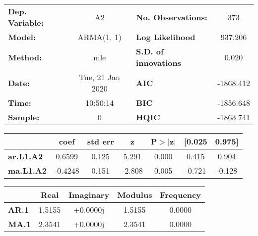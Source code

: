 \begin{center}
\begin{tabular}{lclc}
\toprule
\textbf{Dep. Variable:} &             A2            & \textbf{  No. Observations:  } &            373             \\
\textbf{Model:}         &         ARMA(1, 1)        & \textbf{  Log Likelihood     } &          937.206           \\
\textbf{Method:}        &            mle            & \textbf{  S.D. of innovations} &           0.020            \\
\textbf{Date:}          &      Tue, 21 Jan 2020     & \textbf{  AIC                } &         -1868.412          \\
\textbf{Time:}          &          10:50:14         & \textbf{  BIC                } &         -1856.648          \\
\textbf{Sample:}        &             0             & \textbf{  HQIC               } &         -1863.741          \\
\bottomrule
\end{tabular}
\begin{tabular}{lcccccc}
                  & \textbf{coef} & \textbf{std err} & \textbf{z} & \textbf{P$>$$|$z$|$} & \textbf{[0.025} & \textbf{0.975]}  \\
\midrule
\textbf{ar.L1.A2} &       0.6599  &        0.125     &     5.291  &         0.000        &        0.415    &        0.904     \\
\textbf{ma.L1.A2} &      -0.4248  &        0.151     &    -2.808  &         0.005        &       -0.721    &       -0.128     \\
\bottomrule
\end{tabular}
\begin{tabular}{lcccc}
              & \textbf{            Real} & \textbf{         Imaginary} & \textbf{         Modulus} & \textbf{        Frequency}  \\
\midrule
\textbf{AR.1} &                1.5155     &                +0.0000j     &                1.5155     &                0.0000       \\
\textbf{MA.1} &                2.3541     &                +0.0000j     &                2.3541     &                0.0000       \\
\bottomrule
\end{tabular}
\end{center}